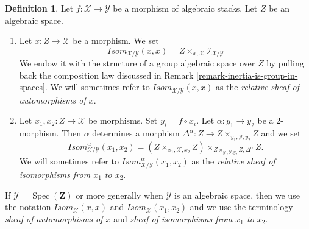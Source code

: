 \documentclass{stacks-project}
\theoremstyle{plain}
\theoremstyle{definition}
\newtheorem{definition}[subsection]{Definition}
\theoremstyle{remark}
\numberwithin{equation}{subsection}
\def\Spec{\mathop{\mathrm{Spec}}}
\begin{document}
\begin{definition}
\label{definition-isom}
Let $f : \mathcal{X} \to \mathcal{Y}$ be a morphism of algebraic stacks.
Let $Z$ be an algebraic space.
\begin{enumerate}
\item Let $x : Z \to \mathcal{X}$ be a morphism. We set
$$
\mathit{Isom}_{\mathcal{X}/\mathcal{Y}}(x, x) =
Z \times_{x, \mathcal{X}} \mathcal{I}_{\mathcal{X}/\mathcal{Y}}
$$
We endow it with the structure of a group algebraic space over $Z$
by pulling back the composition law discussed in
Remark \ref{remark-inertia-is-group-in-spaces}.
We will sometimes refer to $\mathit{Isom}_{\mathcal{X}/\mathcal{Y}}(x, x)$
as the {\it relative sheaf of automorphisms of $x$}.
\item Let $x_1, x_2 : Z \to \mathcal{X}$ be morphisms. Set
$y_i = f \circ x_i$. Let $\alpha : y_1 \to y_2$ be a $2$-morphism.
Then $\alpha$ determines a morphism
$\Delta^\alpha : Z \to Z \times_{y_1, \mathcal{Y}, y_2} Z$ and we set
$$
\mathit{Isom}_{\mathcal{X}/\mathcal{Y}}^\alpha(x_1, x_2) =
(Z \times_{x_1, \mathcal{X}, x_2} Z)
\times_{Z \times_{y_1, \mathcal{Y}, y_2} Z, \Delta^\alpha} Z.
$$
We will sometimes refer to
$\mathit{Isom}_{\mathcal{X}/\mathcal{Y}}^\alpha(x_1, x_2)$
as the {\it relative sheaf of isomorphisms from $x_1$ to $x_2$}.
\end{enumerate}
If $\mathcal{Y} = \Spec(\mathbf{Z})$ or more generally when $\mathcal{Y}$
is an algebraic space, then we use the notation
$\mathit{Isom}_\mathcal{X}(x, x)$ and $\mathit{Isom}_\mathcal{X}(x_1, x_2)$
and we use the terminology {\it sheaf of automorphisms of $x$}
and {\it sheaf of isomorphisms from $x_1$ to $x_2$}.
\end{definition}
\end{document}
